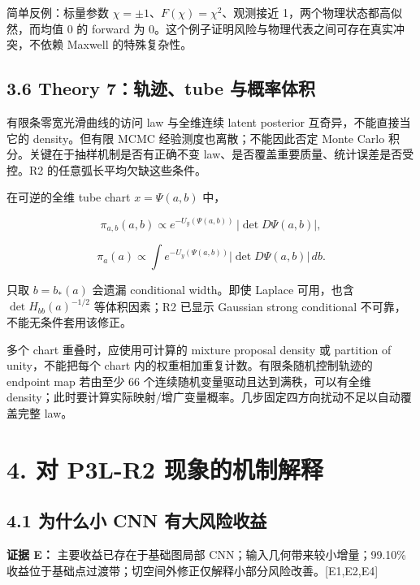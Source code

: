 \documentclass[
  11pt,
  a4paper,
]{article}
\begin{document}
简单反例：标量参数 \(\chi=\pm1\)、\(F(\chi)=\chi^2\)、观测接近
1，两个物理状态都高似然，而均值 0 的 forward 为
0。这个例子证明风险与物理代表之间可存在真实冲突，不依赖 Maxwell
的特殊复杂性。

\hypertarget{theory-7ux8f68ux8ff9tube-ux4e0eux6982ux7387ux4f53ux79ef}{%
\subsection{3.6 Theory 7：轨迹、tube
与概率体积}\label{theory-7ux8f68ux8ff9tube-ux4e0eux6982ux7387ux4f53ux79ef}}

有限条零宽光滑曲线的访问 law 与全维连续 latent posterior
互奇异，不能直接当它的 density。但有限 MCMC 经验测度也离散；不能因此否定
Monte Carlo 积分。关键在于抽样机制是否有正确不变
law、是否覆盖重要质量、统计误差是否受控。R2 的任意弧长平均欠缺这些条件。

在可逆的全维 tube chart \(x=\Psi(a,b)\) 中，

\[\pi_{a,b}(a,b)\propto e^{-U_y(\Psi(a,b))}\,|\det D\Psi(a,b)|,\]

\[\pi_a(a)\propto\int e^{-U_y(\Psi(a,b))}|\det D\Psi(a,b)|\,db.\]

只取 \(b=b_*(a)\) 会遗漏 conditional width。即使 Laplace 可用，也含
\(\det H_{bb}(a)^{-1/2}\) 等体积因素；R2 已显示 Gaussian strong
conditional 不可靠，不能无条件套用该修正。

多个 chart 重叠时，应使用可计算的 mixture proposal density 或 partition
of unity，不能把每个 chart 内的权重相加重复计数。有限条随机控制轨迹的
endpoint map 若由至少 66 个连续随机变量驱动且达到满秩，可以有全维
density；此时要计算实际映射/增广变量概率。几步固定四方向扰动不足以自动覆盖完整
law。

\hypertarget{ux5bf9-p3l-r2-ux73b0ux8c61ux7684ux673aux5236ux89e3ux91ca}{%
\section{4. 对 P3L-R2
现象的机制解释}\label{ux5bf9-p3l-r2-ux73b0ux8c61ux7684ux673aux5236ux89e3ux91ca}}

\hypertarget{ux4e3aux4ec0ux4e48ux5c0f-cnn-ux6709ux5927ux98ceux9669ux6536ux76ca}{%
\subsection{4.1 为什么小 CNN
有大风险收益}\label{ux4e3aux4ec0ux4e48ux5c0f-cnn-ux6709ux5927ux98ceux9669ux6536ux76ca}}

\textbf{证据 E：} 主要收益已存在于基础图局部
CNN；输入几何带来较小增量；99.10\%
收益位于基础点过渡带；切空间外修正仅解释小部分风险改善。{[}E1,E2,E4{]}
\end{document}
